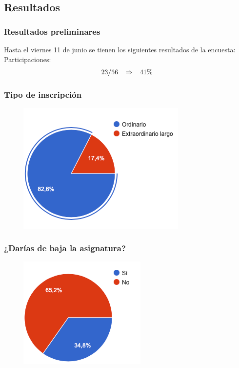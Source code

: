 \subsection{Resultados}
\begin{frame}
\frametitle{Resultados preliminares}
Hasta el viernes 11 de junio se tienen los siguientes resultados de la encuesta:
\\
\bigskip
\pause
Participaciones: 
\begin{align*}
23/56 \hspace{0.3cm} \Rightarrow \hspace{0.3cm} 41 \% 
\end{align*}
\end{frame}
\begin{frame}
\frametitle{Tipo de inscripción}
\begin{figure}
    \centering
    \includegraphics[scale=0.6]{Imagenes/Encuesta_Asesorias_01.png}
\end{figure}
\end{frame}
\begin{frame}
\frametitle{¿Darías de baja la asignatura?}
\begin{figure}
    \centering
    \includegraphics[scale=0.6]{Imagenes/Encuesta_Asesorias_02.png}
\end{figure}
\end{frame}
